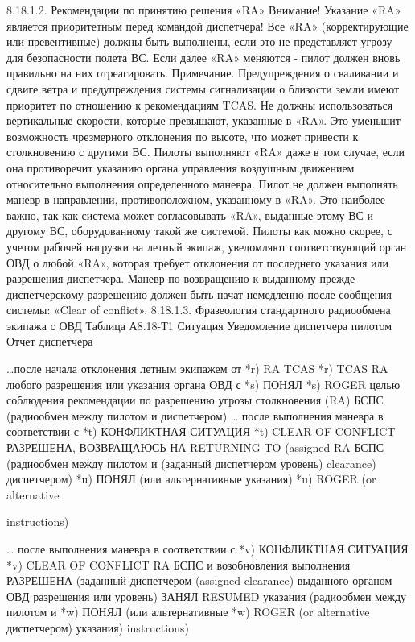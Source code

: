 8.18.1.2.	Рекомендации по принятию решения «RA»
Внимание! Указание «RA» является приоритетным перед командой диспетчера!
Все «RA» (корректирующие или превентивные) должны быть выполнены, если это не представляет угрозу для безопасности полета ВС. Если далее «RA» меняются - пилот должен вновь правильно на них отреагировать.
Примечание. Предупреждения о сваливании и сдвиге ветра и предупреждения системы сигнализации о близости земли имеют приоритет по отношению к рекомендациям TCAS.
Не должны использоваться вертикальные скорости, которые превышают, указанные в «RA». Это уменьшит возможность чрезмерного отклонения по высоте, что может привести к столкновению с другими ВС.
Пилоты выполняют «RA» даже в том случае, если она противоречит указанию органа управления воздушным движением относительно выполнения определенного маневра.
Пилот не должен выполнять маневр в направлении, противоположном, указанному в «RA». Это наиболее важно, так как система может согласовывать «RA», выданные этому ВС и другому ВС, оборудованному такой же системой.
Пилоты как можно скорее, с учетом рабочей нагрузки на летный экипаж, уведомляют соответствующий орган ОВД о любой «RA», которая требует отклонения от последнего указания или разрешения диспетчера.
Маневр по возвращению к выданному прежде диспетчерскому разрешению должен быть начат немедленно после сообщения системы: «Clear of conflict».
8.18.1.3.	Фразеология стандартного радиообмена экипажа с ОВД
                                                                                                                                                        Таблица А8.18-Т1
Ситуация	Уведомление диспетчера пилотом	Отчет диспетчера
		
…после начала отклонения летным экипажем от	*r) RA TCAS	*r) TCAS RA
любого разрешения или указания органа ОВД с	*s) ПОНЯЛ	*s) ROGER
целью соблюдения рекомендации по разрешению		
угрозы столкновения (RA) БСПС (радиообмен		
между пилотом и диспетчером)		
… после выполнения маневра в соответствии с	*t) КОНФЛИКТНАЯ СИТУАЦИЯ	*t) CLEAR OF CONFLICT
	РАЗРЕШЕНА, ВОЗВРАЩАЮСЬ НА	RETURNING TO (assigned
RA БСПС (радиообмен между пилотом и	(заданный диспетчером уровень)	clearance)
диспетчером)	*u) ПОНЯЛ (или альтернативные указания)	*u) ROGER (or alternative
		
		instructions)
		
… после выполнения маневра в соответствии с	*v) КОНФЛИКТНАЯ СИТУАЦИЯ	*v) CLEAR OF CONFLICT
RA БСПС и возобновления выполнения	РАЗРЕШЕНА (заданный диспетчером	(assigned clearance)
выданного органом ОВД разрешения или	уровень) ЗАНЯЛ	RESUMED
указания (радиообмен между пилотом и	*w) ПОНЯЛ (или альтернативные	*w) ROGER (or alternative
диспетчером)	указания)	instructions)
		
